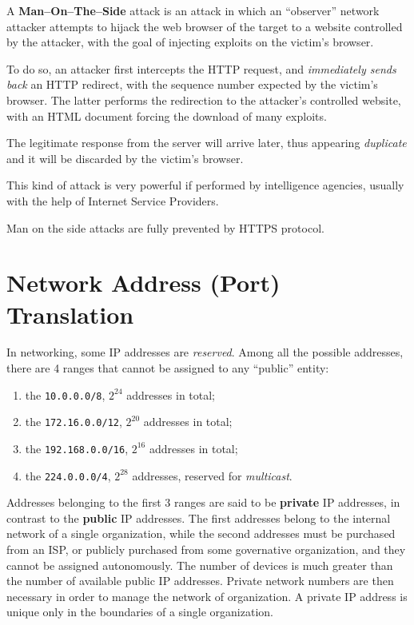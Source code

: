 \documentclass[10pt]{\classname}
\begin{document}
A \textbf{Man--On--The--Side} attack is an attack in which an ``observer''
network attacker attempts to hijack the web browser of the target to a website
controlled by the attacker, with the goal of injecting exploits on the victim's
browser.

To do so, an attacker first intercepts the HTTP request, and \emph{immediately
sends back} an HTTP redirect, with the sequence number expected by the victim's
browser. The latter performs the redirection to the attacker's controlled
website, with an HTML document forcing the download of many exploits.

The legitimate response from the server will arrive later, thus appearing
\emph{duplicate} and it will be discarded by the victim's browser.

This kind of attack is very powerful if performed by intelligence agencies,
usually with the help of Internet Service Providers.

Man on the side attacks are fully prevented by HTTPS protocol.

\chapter{Network Address (Port) Translation}

In networking, some IP addresses are \emph{reserved}. Among all the possible
addresses, there are 4 ranges that cannot be assigned to any ``public'' entity:
\begin{enumerate}
    \item the \texttt{10.0.0.0/8}, $2^{24}$ addresses in total;
    \item the \texttt{172.16.0.0/12}, $2^{20}$ addresses in total; 
    \item the \texttt{192.168.0.0/16}, $2^{16}$ addresses in total; 
    \item the \texttt{224.0.0.0/4}, $2^{28}$ addresses, reserved for
        \emph{multicast}.
\end{enumerate}

Addresses belonging to the first 3 ranges are said to be \textbf{private} IP
addresses, in contrast to the \textbf{public} IP addresses. The first addresses
belong to the internal network of a single organization, while the second
addresses must be purchased from an ISP, or publicly purchased from some
governative organization, and they cannot be assigned autonomously. The number
of devices is much greater than the number of available public IP addresses.
Private network numbers are then necessary in order to manage the network of
organization. A private IP address is unique only in the boundaries of a single
organization.
\end{document}
